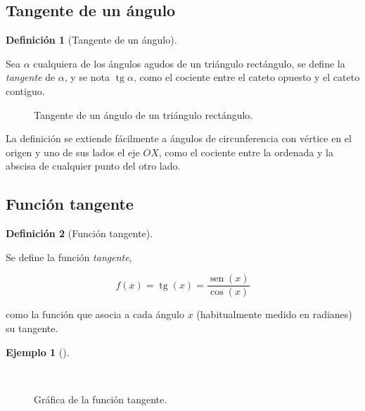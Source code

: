 \documentclass[
  a4paper,
]{scrreport}
\theoremstyle{plain}
\theoremstyle{plain}
\theoremstyle{definition}
\newtheorem{definition}{Definición}[chapter]
\theoremstyle{definition}
\newtheorem{example}{Ejemplo}[chapter]
\theoremstyle{plain}
\theoremstyle{remark}
\begin{document}
\hypertarget{tangente-de-un-uxe1ngulo}{%
\subsection{Tangente de un ángulo}\label{tangente-de-un-uxe1ngulo}}

\leavevmode{}%
\begin{definition}[Tangente de un ángulo]\label{def-tangente-angulo}

Sea \(\alpha\) cualquiera de los ángulos agudos de un triángulo
rectángulo, se define la \emph{tangente} de \(\alpha\), y se nota
\(\operatorname{tg} \alpha\), como el cociente entre el cateto opuesto y
el cateto contiguo.

\end{definition}

\begin{figure}

{\centering 



}

\caption{Tangente de un ángulo de un triángulo rectángulo.}

\end{figure}

La definición se extiende fácilmente a ángulos de circunferencia con
vértice en el origen y uno de sus lados el eje \(OX\), como el cociente
entre la ordenada y la abscisa de cualquier punto del otro lado.

\hypertarget{funciuxf3n-tangente}{%
\subsection{Función tangente}\label{funciuxf3n-tangente}}

\leavevmode{}%
\begin{definition}[Función tangente]\label{def-funcion-tangente}

Se define la función \emph{tangente},

\[f(x)=\operatorname{tg}(x)=\frac{\operatorname{sen}(x)}{\cos(x)}\]

como la función que asocia a cada ángulo \(x\) (habitualmente medido en
radianes) su tangente.

\end{definition}

\leavevmode{}%
\begin{example}[]\label{exm-funcion-tangente}

~

\begin{figure}

{\centering 



}

\caption{Gráfica de la función tangente.}

\end{figure}

\end{example}
\end{document}
